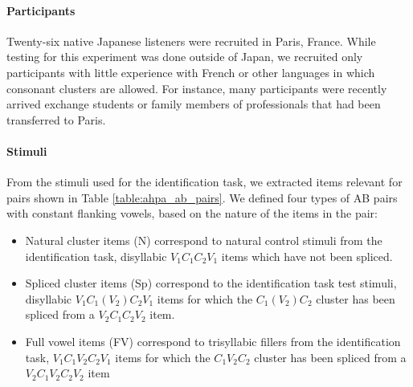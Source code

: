 {\paragraph{Participants}
Twenty-six native Japanese listeners were recruited in Paris, France. %
While testing for this experiment was done outside of Japan, we recruited only participants with little experience with French or other languages in which consonant clusters are allowed. For instance, many participants were recently arrived exchange students or family members of professionals that had been transferred to Paris.  

\paragraph{Stimuli}
From the stimuli used for the identification task, we extracted items relevant for pairs shown in Table \ref{table:ahpa_ab_pairs}.
We defined four types of AB pairs with constant flanking vowels, based on the nature of the items in the pair:

\begin{itemize}
\item Natural cluster items (N) correspond to natural control stimuli from the identification task, disyllabic $V_{1}C_{1}C_{2}V_{1}$ items which have not been spliced.
\item Spliced cluster items (Sp) correspond to the identification task test stimuli, disyllabic $V_{1}C_{1}(V_{2})C_{2}V_{1}$ items for which the $C_{1}(V_{2})C_{2}$ cluster has been spliced from a $V_{2}C_{1}C_{2}V_{2}$ item.
  \item Full vowel items (FV) correspond to trisyllabic fillers from the identification task, $V_{1}C_{1}V_{2}C_{2}V_{1}$ items for which the $C_{1}V_{2}C_{2}$ cluster has been spliced from a $V_{2}C_{1}V_{2}C_{2}V_{2}$ item
\end{itemize}

}
